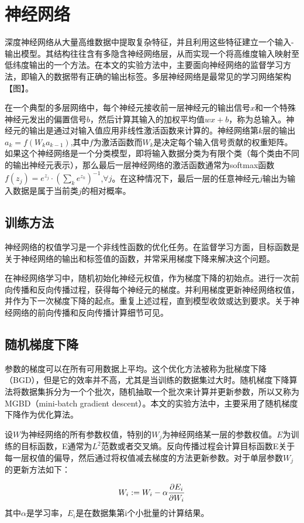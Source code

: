 \documentclass[zihao = -4,cn]{oucart}
\begin{document}
\section{神经网络}
深度神经网络从大量高维数据中提取复杂特征，并且利用这些特征建立一个输入-输出模型。其结构往往含有多隐含神经网络层，从而实现一个将高维度输入映射至低纬度输出的一个方法。在本文的实验方法中，主要面向神经网络的监督学习方法，即输入的数据带有正确的输出标签。多层神经网络是最常见的学习网络架构【图】。\par
在一个典型的多层网络中，每个神经元接收前一层神经元的输出信号$x$和一个特殊神经元发出的偏置信号$b$，然后计算其输入的加权平均值$wx+b$，称为总输入。神经元的输出是通过对输入值应用非线性激活函数来计算的。神经网络第$k$层的输出$a_k = f(W_ka_{k-1})$,其中$f$为激活函数而$W_k$是决定每个输入信号贡献的权重矩阵。如果这个神经网络是一个分类模型，即将输入数据分类为有限个类（每个类由不同的输出神经元表示），那么最后一层神经网络的激活函数通常为softmax函数$f(z_j)=e^{z_j}\cdot(\sum_k{e^{z_k}})^{-1}$,$\forall{j}$。在这种情况下，最后一层的任意神经元$j$输出为输入数据是属于当前类$j$的相对概率。\par

\subsection{训练方法}
神经网络的权值学习是一个非线性函数的优化任务。在监督学习方面，目标函数是关于神经网络的输出和标签值的函数，并常采用梯度下降来解决这个问题。\par
在神经网络学习中，随机初始化神经元权值，作为梯度下降的初始点。进行一次前向传播和反向传播过程，获得每个神经元的梯度。并利用梯度更新神经网络权值，并作为下一次梯度下降的起点。重复上述过程，直到模型收敛或达到要求。关于神经网络的前向传播和反向传播计算细节可见\cite{周志华2016机器学习}。 \par

\subsection{随机梯度下降}
参数的梯度可以在所有可用数据上平均。这个优化方法被称为批梯度下降（BGD），但是它的效率并不高，尤其是当训练的数据集过大时。随机梯度下降算法将数据集拆分为一个个批次，随机抽取一个批次来计算并更新参数，所以又称为MGBD（mini-batch gradient descent）。本文的实验方法中，主要采用了随机梯度下降作为优化算法。\par
设$W$为神经网络的所有参数权值，特别的$W_j$为神经网络某一层的参数权值。$E$为训练的目标函数，E通常为$L^2$范数或者交叉熵\cite{murphy2012machine}。反向传播过程会计算目标函数E关于每一层权值的偏导，然后通过将权值减去梯度的方法更新参数。对于单层参数$W_j$的更新方法如下：\par
\begin{equation}
W_i := W_i - \alpha \frac{\partial E_i}{\partial W_i}\\
\end{equation}
其中$\alpha$是学习率，$E_i$是在数据集第i个小批量的计算结果。
\end{document}
